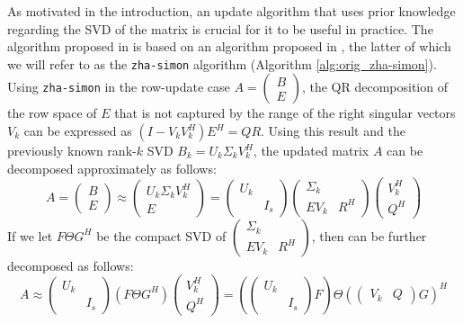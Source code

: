 As motivated in the introduction, an update algorithm that uses prior knowledge regarding the SVD of the matrix is crucial for it to be useful in practice. The algorithm proposed in \cite{Kalantzis2021} is based on an algorithm proposed in \cite{Zha1999}, the latter of which we will refer to as the \verb+zha-simon+ algorithm (Algorithm \ref{alg:orig_zha-simon}). Using \verb+zha-simon+ in the row-update case $A=\begin{pmatrix} B \\ E \end{pmatrix}$, the QR decomposition of the row space of $E$ that is not captured by the range of the right singular vectors $V_k$ can be expressed as $(I-V_k V_k^H)E^H = QR$. Using this result and the previously known rank-$k$ SVD $B_k=U_k \Sigma_k V_k^H$, the updated matrix $A$ can be decomposed approximately as follows:
\begin{equation}
  A = \begin{pmatrix} B \\ E \end{pmatrix} \approx
  \begin{pmatrix} U_k \Sigma_k V_k^H \\ E \end{pmatrix} = 
  \begin{pmatrix} U_k & \\ & I_s \end{pmatrix} \begin{pmatrix} \Sigma_k & \\ EV_k & R^H \end{pmatrix} \begin{pmatrix} V_k^H \\ Q^H \end{pmatrix}
  \label{eq:zhasimon_partial}
\end{equation}
If we let $F\Theta G^H$ be the compact SVD of $\begin{pmatrix} \Sigma_k & \\ EV_k & R^H \end{pmatrix}$, then  can be further decomposed as follows:
\begin{equation}
  A \approx 
  \begin{pmatrix} U_k & \\ & I_s \end{pmatrix} \left(F\Theta G^H\right) \begin{pmatrix} V_k^H \\ Q^H \end{pmatrix}
  = \left( \begin{pmatrix} U_k & \\ & I_s \end{pmatrix} F \right) \Theta \left( \begin{pmatrix} V_k & Q \end{pmatrix} G \right) ^H
  \label{eq:zhasimon_full}
\end{equation}
